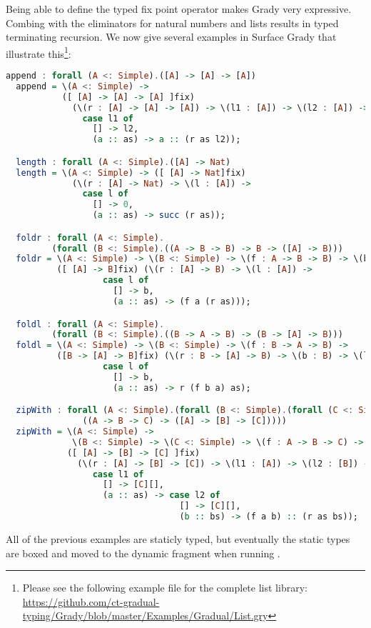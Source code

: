 Being able to define the typed fix point operator makes Grady very
expressive.  Combing  with the eliminators for natural
numbers and lists results in typed terminating recursion.  We now give
several examples in Surface Grady that illustrate this\footnote{Please
  see the following example file for the complete list library:
  \url{https://github.com/ct-gradual-typing/Grady/blob/master/Examples/Gradual/List.gry}}:
\begin{lstlisting}[language=Haskell]
  append : forall (A <: Simple).([A] -> [A] -> [A])
  append = \(A <: Simple) ->
           ([ [A] -> [A] -> [A] ]fix)
             (\(r : [A] -> [A] -> [A]) -> \(l1 : [A]) -> \(l2 : [A]) ->
               case l1 of
                 [] -> l2,
                 (a :: as) -> a :: (r as l2));

  length : forall (A <: Simple).([A] -> Nat)
  length = \(A <: Simple) -> ([ [A] -> Nat]fix)
             (\(r : [A] -> Nat) -> \(l : [A]) ->
               case l of
                 [] -> 0,
                 (a :: as) -> succ (r as));

  foldr : forall (A <: Simple).
         (forall (B <: Simple).((A -> B -> B) -> B -> ([A] -> B)))
  foldr = \(A <: Simple) -> \(B <: Simple) -> \(f : A -> B -> B) -> \(b : B) ->
          ([ [A] -> B]fix) (\(r : [A] -> B) -> \(l : [A]) ->
                   case l of
                     [] -> b,
                     (a :: as) -> (f a (r as)));

  foldl : forall (A <: Simple).
         (forall (B <: Simple).((B -> A -> B) -> (B -> [A] -> B)))
  foldl = \(A <: Simple) -> \(B <: Simple) -> \(f : B -> A -> B) ->
          ([B -> [A] -> B]fix) (\(r : B -> [A] -> B) -> \(b : B) -> \(l : [A]) ->
                   case l of
                     [] -> b,
                     (a :: as) -> r (f b a) as);

  zipWith : forall (A <: Simple).(forall (B <: Simple).(forall (C <: Simple).
               ((A -> B -> C) -> ([A] -> [B] -> [C]))))
  zipWith = \(A <: Simple) ->
             \(B <: Simple) -> \(C <: Simple) -> \(f : A -> B -> C) ->
            ([ [A] -> [B] -> [C] ]fix)
              (\(r : [A] -> [B] -> [C]) -> \(l1 : [A]) -> \(l2 : [B]) ->
                 case l1 of
                   [] -> [C][],
                   (a :: as) -> case l2 of
                                  [] -> [C][],
                                  (b :: bs) -> (f a b) :: (r as bs));
\end{lstlisting}
All of the previous examples are staticly typed, but eventually the
static types are boxed and moved to the dynamic fragment when running
.
